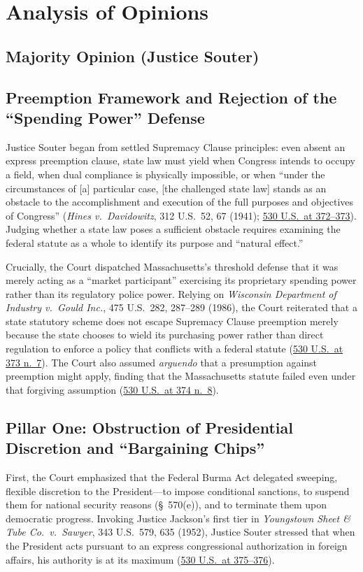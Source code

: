 \documentclass[12pt]{article}
\begin{document}
\section{Analysis of Opinions}
\subsection{Majority Opinion (Justice Souter)}

\subsection{Preemption Framework and Rejection of the ``Spending Power'' Defense}
Justice Souter began from settled Supremacy Clause principles: even absent an express preemption clause, state law must yield when Congress intends to occupy a field, when dual compliance is physically impossible, or when ``under the circumstances of [a] particular case, [the challenged state law] stands as an obstacle to the accomplishment and execution of the full purposes and objectives of Congress'' (\textit{Hines v.\ Davidowitz}, 312 U.S.\ 52, 67 (1941); \href{https://caselaw.findlaw.com/court/us-supreme-court/530/363.html}{530 U.S.\ at 372--373}). Judging whether a state law poses a sufficient obstacle requires examining the federal statute as a whole to identify its purpose and ``natural effect.''

Crucially, the Court dispatched Massachusetts's threshold defense that it was merely acting as a ``market participant'' exercising its proprietary spending power rather than its regulatory police power. Relying on \textit{Wisconsin Department of Industry v.\ Gould Inc.}, 475 U.S.\ 282, 287--289 (1986), the Court reiterated that a state statutory scheme does not escape Supremacy Clause preemption merely because the state chooses to wield its purchasing power rather than direct regulation to enforce a policy that conflicts with a federal statute (\href{https://tile.loc.gov/storage-services/service/ll/usrep/usrep530/usrep530363/usrep530363.pdf}{530 U.S.\ at 373 n.\ 7}). The Court also assumed \textit{arguendo} that a presumption against preemption might apply, finding that the Massachusetts statute failed even under that forgiving assumption (\href{https://www.law.cornell.edu/supct/html/99-474.ZO.html}{530 U.S.\ at 374 n.\ 8}).

\subsection{Pillar One: Obstruction of Presidential Discretion and ``Bargaining Chips''}
First, the Court emphasized that the Federal Burma Act delegated sweeping, flexible discretion to the President---to impose conditional sanctions, to suspend them for national security reasons (\S~570(e)), and to terminate them upon democratic progress. Invoking Justice Jackson's first tier in \textit{Youngstown Sheet \& Tube Co.\ v.\ Sawyer}, 343 U.S.\ 579, 635 (1952), Justice Souter stressed that when the President acts pursuant to an express congressional authorization in foreign affairs, his authority is at its maximum (\href{https://www.law.cornell.edu/supct/html/99-474.ZS.html}{530 U.S.\ at 375--376}).
\end{document}
